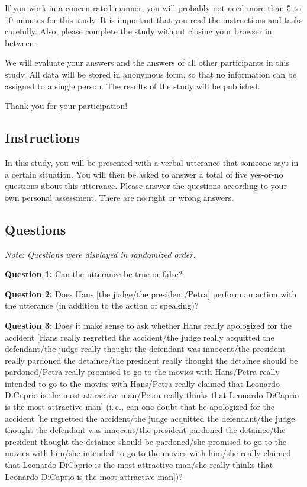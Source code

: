\documentclass[egregdoesnotlikesansseriftitles,12pt]{scrartcl}
\begin{document}
If you work in a concentrated manner, you will probably not need more than 5 to 10 minutes for this study. It is important that you read the instructions and tasks carefully. Also, please complete the study without closing your browser in between.

We will evaluate your answers and the answers of all other participants in this study. All data will be stored in anonymous form, so that no information can be assigned to a single person. The results of the study will be published.

Thank you for your participation!


\subsection{Instructions}\label{sec:app_instructions}
In this study, you will be presented with a verbal utterance that someone says in a certain situation. You will then be asked to answer a total of five yes-or-no questions about this utterance. Please answer the questions according to your own personal assessment. There are no right or wrong answers.


\subsection{Questions}\label{sec:app_questions}
\noindent\textit{Note: Questions were displayed in randomized order.}

\vspace{1ex}
\noindent\textbf{Question 1:} Can the utterance be true or false?

\vspace{1ex}
\noindent\textbf{Question 2:} Does Hans [the judge/the president/Petra] perform an action with the utterance (in addition to the action of speaking)?

\vspace{1ex}
\noindent\textbf{Question 3:} Does it make sense to ask whether Hans really apologized for the accident [Hans really regretted the accident/the judge really acquitted the defendant/the judge really thought the defendant was innocent/the president really pardoned the detainee/the president really thought the detainee should be pardoned/Petra really promised to go to the movies with Hans/Petra really intended to go to the movies with Hans/Petra really claimed that Leonardo DiCaprio is the most attractive man/Petra really thinks that Leonardo DiCaprio is the most attractive man] (i.\,e., can one doubt that he apologized for the accident [he regretted the accident/the judge acquitted the defendant/the judge thought the defendant was innocent/the president pardoned the detainee/the president thought the detainee should be pardoned/she promised to go to the movies with him/she intended to go to the movies with him/she really claimed that Leonardo DiCaprio is the most attractive man/she really thinks that Leonardo DiCaprio is the most attractive man])?
\end{document}

